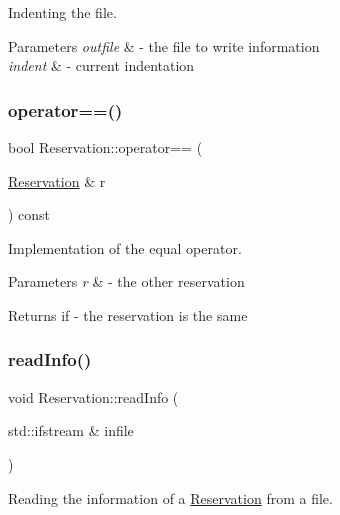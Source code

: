 Indenting the file. 


\begin{DoxyParams}{Parameters}
{\em outfile} & -\/ the file to write information \\
\hline
{\em indent} & -\/ current indentation \\
\hline
\end{DoxyParams}
\mbox{\label{class_reservation_ae033fc48c694b375e0cc68215f7dcfdb}} 
\subsubsection{\texorpdfstring{operator==()}{operator==()}}
{\footnotesize\ttfamily bool Reservation\+::operator== (\begin{DoxyParamCaption}\item[{\mbox{\hyperlink{class_reservation}{Reservation}} \&}]{r }\end{DoxyParamCaption}) const}



Implementation of the equal operator. 


\begin{DoxyParams}{Parameters}
{\em r} & -\/ the other reservation \\
\hline
\end{DoxyParams}
\begin{DoxyReturn}{Returns}
if -\/ the reservation is the same 
\end{DoxyReturn}
\mbox{\label{class_reservation_acff32024a350c2156af9f74522c59b7b}} 
\subsubsection{\texorpdfstring{read\+Info()}{readInfo()}}
{\footnotesize\ttfamily void Reservation\+::read\+Info (\begin{DoxyParamCaption}\item[{std\+::ifstream \&}]{infile }\end{DoxyParamCaption})\hspace{0.3cm}{\ttfamily [virtual]}}



Reading the information of a \mbox{\hyperlink{class_reservation}{Reservation}} from a file. 


